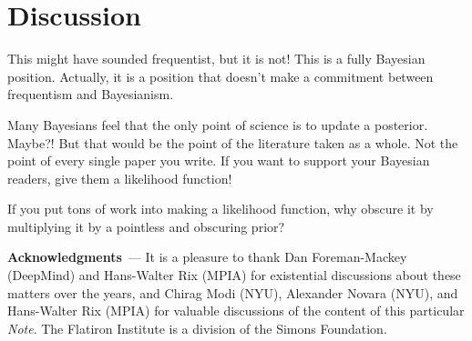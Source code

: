 \documentclass{article}
\renewcommand{\paragraph}[1]{\bigskip\par\noindent\textbf{#1}~---}
\newcommand{\documentname}{\textsl{Note}}
\begin{document}
\section{Discussion}\label{sec:discussion}
This might have sounded frequentist, but it is not!
This is a fully Bayesian position.
Actually, it is a position that doesn't make a commitment between frequentism and Bayesianism.

Many Bayesians feel that the only point of science is to update a posterior. Maybe?! But that would be the point of the literature taken as a whole. Not the point of every single paper you write.
If you want to support your Bayesian readers, give them a likelihood function!

If you put tons of work into making a likelihood function, why obscure it by multiplying it by a pointless and obscuring prior?

\paragraph{Acknowledgments}
It is a pleasure to thank
  Dan Foreman-Mackey (DeepMind) and
  Hans-Walter Rix (MPIA)
for existential discussions about these matters over the years, and
  Chirag Modi (NYU),
  Alexander Novara (NYU), and
  Hans-Walter Rix (MPIA)
for valuable discussions of the content of this particular \documentname.
The Flatiron Institute is a division of the Simons Foundation.

\raggedright


\end{document}
